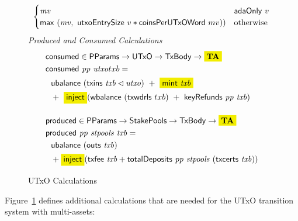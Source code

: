 \begin{figure}[htb]
\begin{align*}
\begin{cases}
      \mathit{mv} & \mathsf{adaOnly}~v \\
      \mathsf{max}~(\mathit{mv},~\mathsf{utxoEntrySize}~{v} * \mathsf{coinsPerUTxOWord}~mv)) & \text{otherwise}
    \end{cases}
  \end{align*}
  \emph{Produced and Consumed Calculations}
  \begin{align*}
    & \fun{consumed} \in \PParams \to \UTxO \to \TxBody \to \hldiff{\ValMonoid} \\
    & \consumed{pp}{utxo}{txb} = \\
    & ~~\ubalance{(\txins{txb} \restrictdom \var{utxo})} ~+~ \hldiff{\fun{mint}~\var{txb}} \\
    &~~+~\hldiff{\fun{inject}}(\fun{wbalance}~(\fun{txwdrls}~{txb})~+~ \keyRefunds{pp}{txb})
    \nextdef
    & \fun{produced} \in \PParams \to \StakePools \to \TxBody \to \hldiff{\ValMonoid} \\
    & \fun{produced}~\var{pp}~\var{stpools}~\var{txb} = \\
    &~~\ubalance{(\fun{outs}~{txb})} \\
    &~~+ \hldiff{\fun{inject}}(\txfee{txb} + \totalDeposits{pp}{stpools}{(\txcerts{txb})})
  \end{align*}
  \caption{UTxO Calculations}
  \label{fig:functions:utxo}
\end{figure}

Figure~\ref{fig:functions:utxo} defines additional calculations that are needed for the
UTxO transition system with multi-assets:

